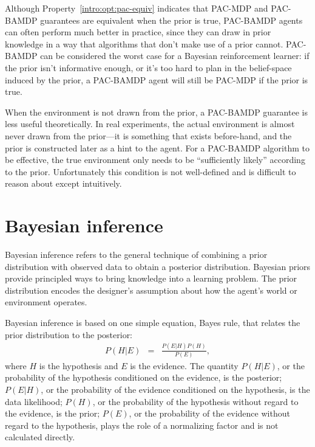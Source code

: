 Although Property~\ref{intro:opt:pac-equiv} indicates that PAC-MDP and PAC-BAMDP guarantees are equivalent when the prior is true, PAC-BAMDP agents can often perform much better in practice, since they can draw in prior knowledge in a way that algorithms that don't make use of a prior cannot. PAC-BAMDP can be considered the worst case for a Bayesian reinforcement learner: if the prior isn't informative enough, or it's too hard to plan in the belief-space induced by the prior, a PAC-BAMDP agent will still be PAC-MDP if the prior is true.

When the environment is not drawn from the prior, a PAC-BAMDP guarantee is less useful theoretically. In real experiments, the actual environment is almost never drawn from the prior---it is something that exists before-hand, and the prior is constructed later as a hint to the agent. For a PAC-BAMDP algorithm to be effective, the true environment only needs to be ``sufficiently likely'' according to the prior. Unfortunately this condition is not well-defined and is difficult to reason about except intuitively.  

\section{Bayesian inference}

Bayesian inference refers to the general technique of combining a prior distribution with observed data to obtain a posterior distribution. Bayesian priors provide principled ways to bring knowledge into a learning problem. The prior distribution encodes the designer's assumption about how the agent's world or environment operates.

Bayesian inference is based on one simple equation, Bayes rule, that relates the prior distribution to the posterior:
\begin{eqnarray}
\label{intro:eqn:bayes} P(H|E) &=& \frac{P(E|H)P(H)}{P(E)},
\end{eqnarray}
where $H$ is the hypothesis and $E$ is the evidence. The quantity $P(H|E)$, or the probability of the hypothesis conditioned on the evidence, is the posterior; $P(E|H)$, or the probability of the evidence conditioned on the hypothesis, is the data likelihood; $P(H)$, or the probability of the hypothesis without regard to the evidence, is the prior; $P(E)$, or the probability of the evidence without regard to the hypothesis, plays the role of a normalizing factor and is not calculated directly.

